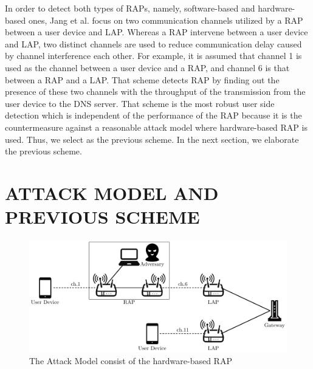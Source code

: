 \documentclass[conference]{IEEEtran}
\begin{document}
In order to detect both types of RAPs, namely, software-based and hardware-based ones, Jang et al. focus on two communication channels utilized by a RAP between a user device and LAP\cite{previous}.
Whereas a RAP intervene between a user device and LAP, two distinct channels are used to reduce communication delay caused by channel interference each other.
For example, it is assumed that channel 1 is used as the channel between a user device and a RAP, and channel 6 is that between a RAP and a LAP.
That scheme detects RAP by finding out the presence of these two channels with the throughput of the transmission from the user device to the DNS server.
That scheme is the most robust user side detection which is independent of the performance of the RAP because it is the countermeasure against a reasonable attack model where hardware-based RAP is used.
Thus, we select \cite{previous} as the previous scheme.
In the next section, we elaborate the previous scheme.

\section{ATTACK MODEL AND PREVIOUS SCHEME}\label{sec:3}
\begin{figure}[t]
    \begin{center}
        \includegraphics[scale=0.5]{attack-model/attack-model.pdf}
        \caption{The Attack Model consist of the hardware-based RAP}
        \label{fig:model}
    \end{center}
\end{figure}
\end{document}
